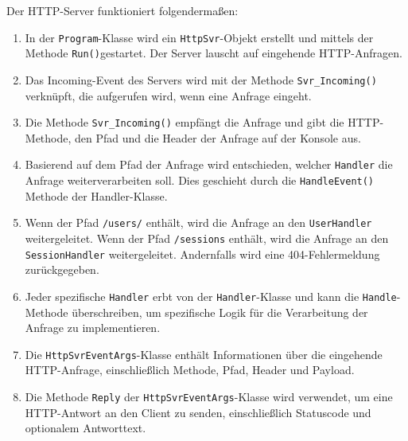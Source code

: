 \documentclass[a4paper, 12pt]{article}
\begin{document}
Der HTTP-Server funktioniert folgendermaßen:
\begin{enumerate}
    \item In der \texttt{Program}-Klasse wird ein \texttt{HttpSvr}-Objekt erstellt und mittels der Methode \texttt{Run()}gestartet. Der Server lauscht auf eingehende HTTP-Anfragen.
    \item Das Incoming-Event des Servers wird mit der Methode \texttt{Svr\_Incoming()} verknüpft, die aufgerufen wird, wenn eine Anfrage eingeht.
    \item Die Methode \texttt{Svr\_Incoming()} empfängt die Anfrage und gibt die HTTP-Methode, den Pfad und die Header der Anfrage auf der Konsole aus.
    \item Basierend auf dem Pfad der Anfrage wird entschieden, welcher \texttt{Handler} die Anfrage weiterverarbeiten soll. Dies geschieht durch die \texttt{HandleEvent()} Methode der {Handler}-Klasse.
    \item Wenn der Pfad \texttt{/users/} enthält, wird die Anfrage an den \texttt{UserHandler} weitergeleitet. Wenn der Pfad \texttt{/sessions} enthält, wird die Anfrage an den \texttt{SessionHandler} weitergeleitet. Andernfalls wird eine 404-Fehlermeldung zurückgegeben.
    \item Jeder spezifische \texttt{Handler} erbt von der \texttt{Handler}-Klasse und kann die \texttt{Handle}-Methode überschreiben, um spezifische Logik für die Verarbeitung der Anfrage zu implementieren.
    \item Die \texttt{HttpSvrEventArgs}-Klasse enthält Informationen über die eingehende HTTP-Anfrage, einschließlich Methode, Pfad, Header und Payload.
    \item Die Methode \texttt{Reply} der \texttt{HttpSvrEventArgs}-Klasse wird verwendet, um eine HTTP-Antwort an den Client zu senden, einschließlich Statuscode und optionalem Antworttext.
\end{enumerate}
\end{document}
